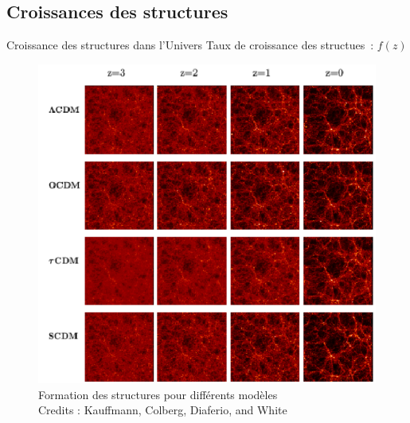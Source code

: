 \documentclass{beamer}
\newcommand{\credits}[1]{\tiny Credits : #1}
\begin{document}
\subsection{Croissances des structures}

\begin{frame}{Croissance des structures dans l'Univers}
	Taux de croissance des structues~: $f(z)$
	\begin{figure}
		\centering
		\includegraphics[height=0.6\textheight]{figures/struct_growth.png}
		\caption{Formation des structures pour différents modèles\\ \credits{Kauffmann, Colberg, Diaferio, and White}}
	\end{figure}
\end{frame}
\end{document}
